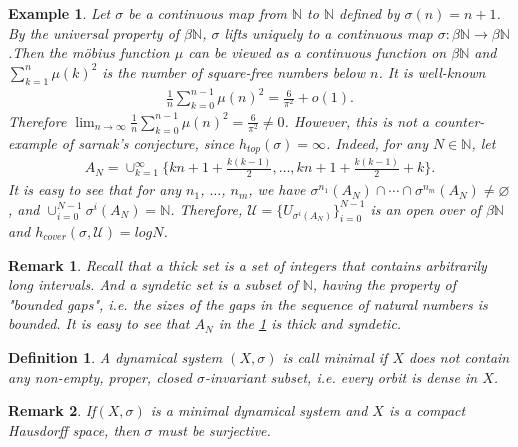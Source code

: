 \documentclass[a4paper,10pt]{amsart}
\newtheorem{example}{Example}[section]
\newtheorem{definition}{Definition}[section]
\newtheorem{remark}{Remark}[section]
\newcommand{\UUU}{\mathcal U}
\newcommand{\N}{\mathbb N} %
\begin{document}
\begin{example}\label{scexp1}
   Let $\sigma$ be a continuous map from $\N$ to $\N$ defined by
   $\sigma(n) = n+1$. By the universal property of $\beta \N$, $\sigma$
   lifts uniquely to a continuous map $\sigma: \beta \N \rightarrow 
   \beta \N$.Then the m\"{o}bius function 
   $\mu$ can be viewed as a continuous
   function on $\beta \N$ and $\sum_{k=1}^{n}\mu(k)^2$ is the number 
   of square-free numbers below $n$. It is well-known
   \begin{align*}
       \frac{1}{n}\sum_{k=0}^{n-1}\mu(n)^2 = \frac{6}{\pi^2} + o(1).
   \end{align*}
   Therefore $\lim_{n \rightarrow \infty}\frac{1}{n}
   \sum_{k=0}^{n-1}\mu(n)^2 = \frac{6}{\pi^2} \neq 0$. 
   However, this is not a counter-example of sarnak's conjecture, 
   since $h_{top}(\sigma) = \infty$.
   Indeed, for any $N \in \N$, let 
   \begin{align*}
       A_{N}= \cup_{k=1}^{\infty}
       \{kn+1+\frac{k(k-1)}{2}, \ldots, kn+1+\frac{k(k-1)}{2}+k\}.
   \end{align*}
   It is easy to see that for any $n_1$, $\ldots$, $n_m$, we have
   $\sigma^{n_1}(A_{N}) \cap \cdots \cap \sigma^{n_m}(A_{N}) 
   \neq \varnothing$, and $\cup^{N-1}_{i=0}\sigma^{i}(A_{N}) = \N$.
   Therefore, $\UUU = \{U_{\sigma^{i}(A_N)} \}_{i=0}^{N-1}$ is an open
   over of $\beta \N$ and $h_{cover}(\sigma, \UUU) = logN$.
\end{example}

\begin{remark}
    Recall that a thick set is a set of integers that contains 
    arbitrarily long intervals. And a syndetic set is a subset of $\N$, 
    having the property of "bounded gaps", i.e. the sizes of the gaps 
    in the sequence of natural numbers is bounded. It is easy to see that
    $A_{N}$ in the \cref{scexp1} is thick and syndetic. 
\end{remark}

\begin{definition}
    A dynamical system $(X, \sigma)$ is call minimal if $X$ does not
    contain any non-empty, proper, closed $\sigma$-invariant subset, 
    i.e. every orbit is dense in $X$.
\end{definition}

\begin{remark}
    If$(X, \sigma)$ is a minimal dynamical system and $X$ is a compact 
    Hausdorff space, then $\sigma$ must be surjective. 
\end{remark}
\end{document}
